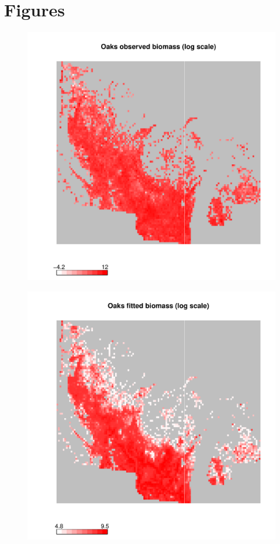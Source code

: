 \documentclass[authoryear, review, 11pt]{elsarticle}
\begin{document}
\section{Figures}
\begin{figure}
	\begin{center}
	\includegraphics[width=5in]{../../figures/Oaks-biomass-observed.pdf}
	\caption{\label{fig:oaks-biomass-observed}}
	\end{center}
\end{figure}

\begin{figure}
	\begin{center}
	\includegraphics[width=5in]{../../figures/Oaks-biomass-fitted.pdf}
	\caption{\label{fig:oaks-biomass-fitted}}
	\end{center}
\end{figure}
\end{document}
